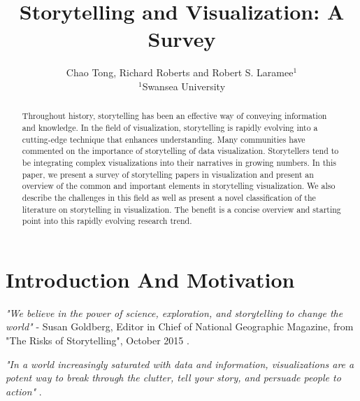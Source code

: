 \documentclass{egpubl}
\begin{document}
\title[Storytelling and Visualization: A Survey]%
      {Storytelling and Visualization: A Survey}

\author[C.Tong \& R.Roberts \& R.S.Laramee]
       {Chao Tong, Richard Roberts
        and Robert S. Laramee$^{1}$
        \\
        $^1$Swansea University
       }

\maketitle
\begin{abstract}
Throughout history, storytelling has been an effective way of conveying information and knowledge. In the field of visualization, storytelling is rapidly evolving into a cutting-edge technique that enhances understanding. Many communities have commented on the importance of storytelling of data visualization. Storytellers tend to be integrating complex visualizations into their narratives in growing numbers. In this paper, we present a survey of storytelling papers in visualization and present an overview of the common and important elements in storytelling visualization. We also describe the challenges in this field as well as present a novel classification of the literature on storytelling in visualization. The benefit is a concise overview and starting point into this rapidly evolving research trend.
\end{abstract}
\section{Introduction And Motivation}
\textit{"We believe in the power of science, exploration, and storytelling to change the world"} - Susan Goldberg, Editor in Chief of National Geographic Magazine, from "The Risks of Storytelling", October 2015 \cite{risks2015}. 

\textit{"In a world increasingly saturated with data and information, visualizations are a potent way to break through the clutter, tell your story, and persuade people to action"} \cite{adam2015}.
\end{document}
